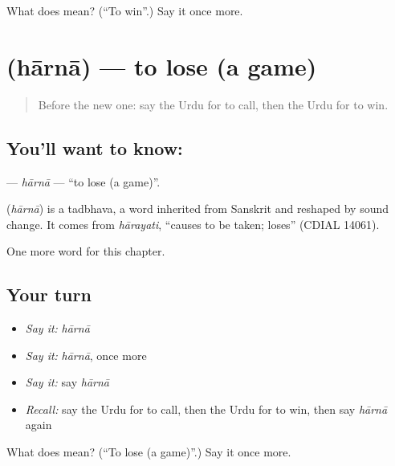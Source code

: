 \begin{tcolorbox}[breakable,colback=teal!4,colframe=teal!35!black,title={Before you move on}]
What does  mean? (\textquotedblleft{}To win\textquotedblright{}.) Say it once more.
\end{tcolorbox}
\section[\texorpdfstring{\ur{ہارنا} (hārnā)}{ہارنا (hārnā)}]{ (hārnā) — to lose (a game)}

\label{lesson:UR-C140-harna}



\begin{quote}
Before the new one: say the Urdu for to call, then the Urdu for to win.
\end{quote}

\subsection*{You'll want to know: }
\textbf{} — \emph{hārnā} — \textquotedblleft{}to lose (a game)\textquotedblright{}.

\begin{cousinweb}
\textbf{} (\emph{hārnā}) is a tadbhava, a word inherited from Sanskrit and reshaped by sound change. It comes from \emph{hārayati}, \textquotedblleft{}causes to be taken; loses\textquotedblright{} (CDIAL 14061).
\end{cousinweb}

\begin{grammarlens}[title={What you've built}]
One more word for this chapter.
\end{grammarlens}

\subsection*{Your turn}
\begin{itemize}
\raggedright
  \item \emph{Say it:} \emph{hārnā}
  \item \emph{Say it:} \emph{hārnā}, once more
  \item \emph{Say it:} say \emph{hārnā}
  \item \emph{Recall:} say the Urdu for to call, then the Urdu for to win, then say \emph{hārnā} again
\end{itemize}

\begin{tcolorbox}[breakable,colback=teal!4,colframe=teal!35!black,title={Before you move on}]
What does  mean? (\textquotedblleft{}To lose (a game)\textquotedblright{}.) Say it once more.
\end{tcolorbox}
